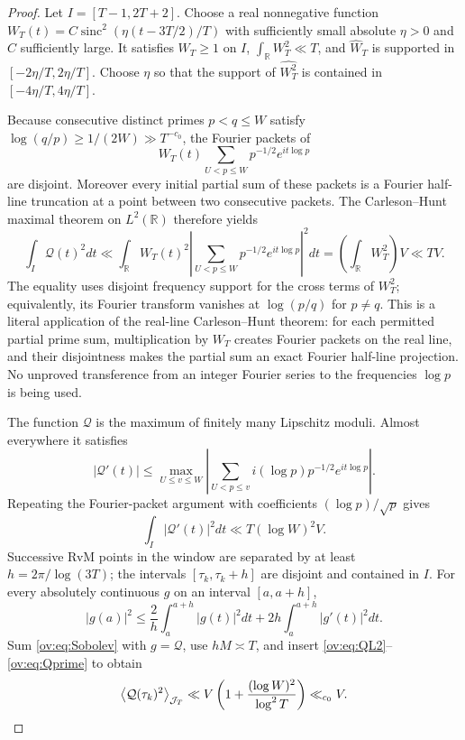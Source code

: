 \documentclass[11pt,reqno]{amsart}
\numberwithin{equation}{section}
\newcommand{\R}{\mathbb R}
\newcommand{\avgJ}[1]{\left\langle #1\right\rangle_{\mathcal J_T}}
\begin{document}
\begin{proof}
Let $I=[T-1,2T+2]$. Choose a real nonnegative function
$W_T(t)=C\operatorname{sinc}^2(\eta(t-3T/2)/T)$ with sufficiently small absolute $\eta>0$ and $C$ sufficiently large. It satisfies $W_T\ge1$ on $I$, $\int_\R W_T^2\ll T$, and $\widehat W_T$ is supported in $[-2\eta/T,2\eta/T]$. Choose $\eta$ so that the support of $\widehat{W_T^2}$ is contained in $[-4\eta/T,4\eta/T]$.

Because consecutive distinct primes $p<q\le W$ satisfy $\log(q/p)\ge1/(2W)\gg T^{-c_0}$, the Fourier packets of
\[W_T(t)\sum_{U<p\le W}p^{-1/2}e^{it\log p}\]
are disjoint. Moreover every initial partial sum of these packets is a Fourier half-line truncation at a point between two consecutive packets. The Carleson--Hunt maximal theorem on $L^2(\R)$ therefore yields
\begin{equation}
\int_I\mathcal Q(t)^2dt
\ll\int_\R W_T(t)^2\left|\sum_{U<p\le W}p^{-1/2}e^{it\log p}\right|^2dt
=\left(\int_\R W_T^2\right)V\ll TV.
\label{ov:eq:QL2}
\end{equation}
The equality uses disjoint frequency support for the cross terms of $W_T^2$; equivalently, its Fourier transform vanishes at $\log(p/q)$ for $p\ne q$.
This is a literal application of the real-line Carleson--Hunt theorem:
for each permitted partial prime sum, multiplication by $W_T$ creates
Fourier packets on the real line, and their disjointness makes the
partial sum an exact Fourier half-line projection. No unproved
transference from an integer Fourier series to the frequencies
$\log p$ is being used.

The function $\mathcal Q$ is the maximum of finitely many Lipschitz moduli. Almost everywhere it satisfies
\[|\mathcal Q'(t)|\le
\max_{U\le v\le W}\left|\sum_{U<p\le v}i(\log p)p^{-1/2}e^{it\log p}\right|.
\]
Repeating the Fourier-packet argument with coefficients $(\log p)/\sqrt p$ gives
\begin{equation}
\int_I|\mathcal Q'(t)|^2dt\ll T(\log W)^2 V.
\label{ov:eq:Qprime}
\end{equation}
Successive RvM points in the window are separated by at least
$h=2\pi/\log(3T)$; the intervals $[\tau_k,\tau_k+h]$ are disjoint and contained in $I$. For every absolutely continuous $g$ on an interval $[a,a+h]$,
\begin{equation}
|g(a)|^2\le\frac2h\int_a^{a+h}|g(t)|^2dt+2h\int_a^{a+h}|g'(t)|^2dt.
\label{ov:eq:Sobolev}
\end{equation}
Sum \eqref{ov:eq:Sobolev} with $g=\mathcal Q$, use $hM\asymp T$, and insert \eqref{ov:eq:QL2}--\eqref{ov:eq:Qprime} to obtain
\[\avgJ{\mathcal Q(\tau_k)^2}\ll V\left(1+\frac{(\log W)^2}{\log^2T}\right)\ll_{c_0}V.\qedhere\]
\end{proof}
\end{document}
